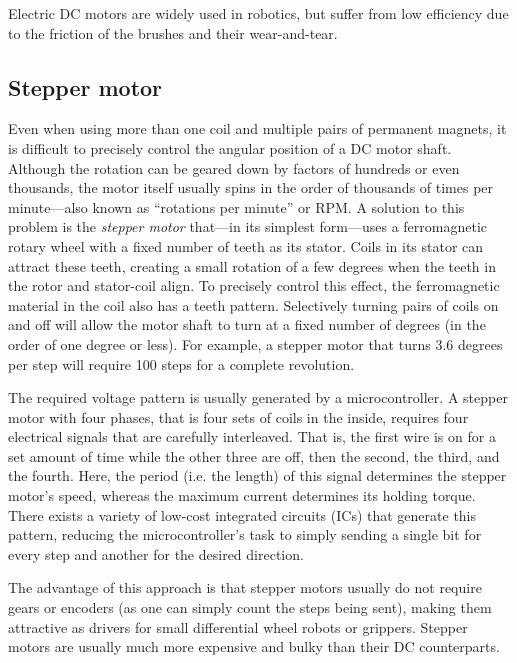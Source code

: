 Electric DC motors are widely used in robotics, but suffer from low efficiency due to the friction of the brushes and their wear-and-tear.

\subsection{Stepper motor}

Even when using more than one coil and multiple pairs of permanent magnets, it is difficult to precisely control the angular position of a DC motor shaft. Although the rotation can be geared down by factors of hundreds or even thousands, the motor itself usually spins in the order of thousands of times per minute---also known as ``rotations per minute'' or RPM.
%
A solution to this problem is the \textsl{stepper motor} that---in its simplest form---uses a ferromagnetic rotary wheel with a fixed number of teeth as its stator. Coils in its stator can attract these teeth, creating a small rotation of a few degrees when the teeth in the rotor and stator-coil align. To precisely control this effect, the ferromagnetic material in the coil also has a teeth pattern. Selectively turning pairs of coils on and off will allow the motor shaft to turn at a fixed number of degrees (in the order of one degree or less). For example, a stepper motor that turns 3.6 degrees per step will require 100 steps for a complete revolution.

The required voltage pattern is usually generated by a microcontroller. A stepper motor with four phases, that is four sets of coils in the inside, requires four electrical signals that are carefully interleaved. That is, the first wire is on for a set amount of time while the other three are off, then the second, the third, and the fourth.
Here, the period (i.e. the length) of this signal determines the stepper motor's speed, whereas the maximum current determines its holding torque.
There exists a variety of low-cost integrated circuits (ICs) that generate this pattern, reducing the microcontroller's task to simply sending a single bit for every step and another for the desired direction.

The advantage of this approach is that stepper motors usually do not require gears or encoders (as one can simply count the steps being sent), making them attractive as drivers for small differential wheel robots or grippers. Stepper motors are usually much more expensive and bulky than their DC counterparts.

